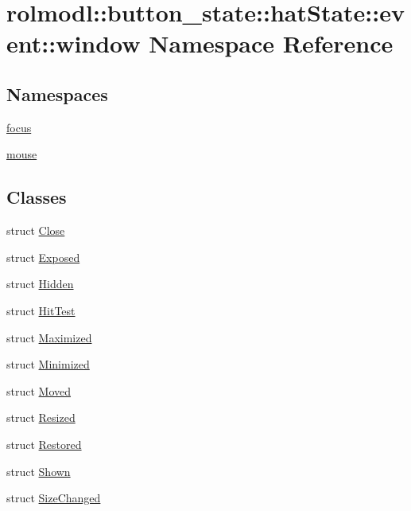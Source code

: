\hypertarget{namespacerolmodl_1_1button__state_1_1hat_state_1_1event_1_1window}{}\section{rolmodl\+::button\+\_\+state\+::hat\+State\+::event\+::window Namespace Reference}
\label{namespacerolmodl_1_1button__state_1_1hat_state_1_1event_1_1window}
\subsection*{Namespaces}
\begin{DoxyCompactItemize}
\item 
 \mbox{\hyperlink{namespacerolmodl_1_1button__state_1_1hat_state_1_1event_1_1window_1_1focus}{focus}}
\item 
 \mbox{\hyperlink{namespacerolmodl_1_1button__state_1_1hat_state_1_1event_1_1window_1_1mouse}{mouse}}
\end{DoxyCompactItemize}
\subsection*{Classes}
\begin{DoxyCompactItemize}
\item 
struct \mbox{\hyperlink{structrolmodl_1_1button__state_1_1hat_state_1_1event_1_1window_1_1_close}{Close}}
\item 
struct \mbox{\hyperlink{structrolmodl_1_1button__state_1_1hat_state_1_1event_1_1window_1_1_exposed}{Exposed}}
\item 
struct \mbox{\hyperlink{structrolmodl_1_1button__state_1_1hat_state_1_1event_1_1window_1_1_hidden}{Hidden}}
\item 
struct \mbox{\hyperlink{structrolmodl_1_1button__state_1_1hat_state_1_1event_1_1window_1_1_hit_test}{Hit\+Test}}
\item 
struct \mbox{\hyperlink{structrolmodl_1_1button__state_1_1hat_state_1_1event_1_1window_1_1_maximized}{Maximized}}
\item 
struct \mbox{\hyperlink{structrolmodl_1_1button__state_1_1hat_state_1_1event_1_1window_1_1_minimized}{Minimized}}
\item 
struct \mbox{\hyperlink{structrolmodl_1_1button__state_1_1hat_state_1_1event_1_1window_1_1_moved}{Moved}}
\item 
struct \mbox{\hyperlink{structrolmodl_1_1button__state_1_1hat_state_1_1event_1_1window_1_1_resized}{Resized}}
\item 
struct \mbox{\hyperlink{structrolmodl_1_1button__state_1_1hat_state_1_1event_1_1window_1_1_restored}{Restored}}
\item 
struct \mbox{\hyperlink{structrolmodl_1_1button__state_1_1hat_state_1_1event_1_1window_1_1_shown}{Shown}}
\item 
struct \mbox{\hyperlink{structrolmodl_1_1button__state_1_1hat_state_1_1event_1_1window_1_1_size_changed}{Size\+Changed}}
\end{DoxyCompactItemize}
